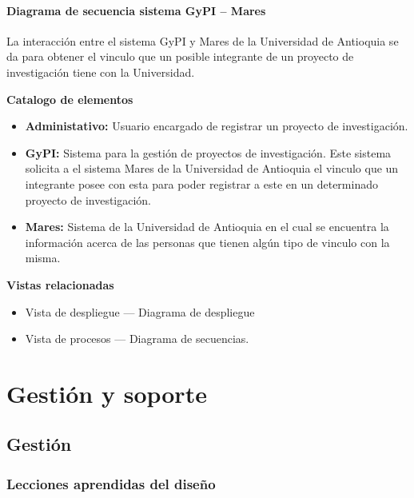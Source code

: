 \documentclass[12pt,oneside,letterpaper]{report}
\begin{document}
\subsubsection{Diagrama de secuencia sistema GyPI – Mares}


La interacción entre el sistema GyPI y Mares de la Universidad de Antioquia se da para obtener el vinculo que un posible integrante de un proyecto de investigación tiene con la Universidad.

\textbf{Catalogo de elementos}

\begin{itemize}
 \item \textbf{Administativo:} Usuario encargado de registrar un proyecto de investigación.
 \item \textbf{GyPI:} Sistema para la gestión de proyectos de investigación. Este sistema solicita a el sistema Mares de la Universidad de Antioquia el vinculo que un integrante posee con esta para poder registrar a este en un determinado proyecto de investigación.
 \item \textbf{Mares:} Sistema de la Universidad de Antioquia en el cual se encuentra la información acerca de las personas que tienen algún tipo de vinculo con la misma.
\end{itemize}

\textbf{Vistas relacionadas}
\begin{itemize}
 \item Vista de despliegue --- Diagrama de despliegue
 \item Vista de procesos --- Diagrama de secuencias.
\end{itemize}


\chapter{Gestión y soporte}
\section{Gestión}
\subsection{Lecciones aprendidas del diseño}
\end{document}
